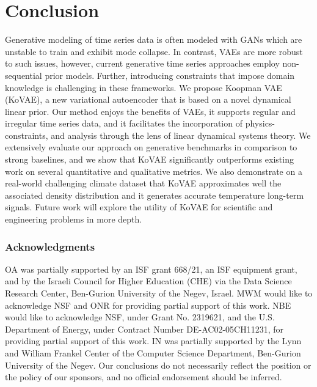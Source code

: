 \documentclass{article} %
\begin{document}
\section{Conclusion}

Generative modeling of time series data is often modeled with GANs which are unstable to train and exhibit mode collapse. In contrast, VAEs are more robust to such issues, however, current generative time series approaches employ non-sequential prior models. Further, introducing constraints that impose domain knowledge is challenging in these frameworks. We propose Koopman VAE (KoVAE), a new variational autoencoder that is based on a novel dynamical linear prior. Our method enjoys the benefits of VAEs, it supports regular and irregular time series data, and it facilitates the incorporation of physics-constraints, and analysis through the lens of linear dynamical systems theory. We extensively evaluate our approach on generative benchmarks in comparison to strong baselines, and we show that KoVAE significantly outperforms existing work on several quantitative and qualitative metrics. We also demonstrate on a real-world challenging climate dataset that KoVAE approximates well the associated density distribution and it generates accurate temperature long-term signals. Future work will explore the utility of KoVAE for scientific and engineering problems in more depth.


\clearpage

\subsubsection*{Acknowledgments}

OA was partially supported by an ISF grant 668/21, an ISF equipment grant, and by the Israeli Council for Higher Education (CHE) via the Data Science Research Center, Ben-Gurion University of the Negev, Israel. 
MWM would like to acknowledge NSF and ONR for providing partial support of this work.
NBE would like to acknowledge NSF, under Grant No. 2319621, and the U.S. Department of Energy, under Contract Number DE-AC02-05CH11231, for providing partial support of this work. IN was partially supported by the Lynn and
William Frankel Center of the Computer Science Department, Ben-Gurion University of the Negev.
%
Our conclusions do not necessarily reflect the position or the policy of our sponsors, and no official endorsement should be inferred.




\end{document}

